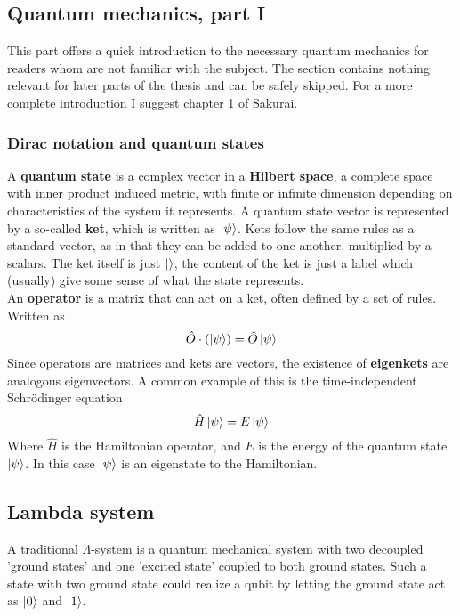 \subsection{Quantum mechanics, part I}
This part offers a quick introduction to the necessary  quantum mechanics for readers whom are not familiar with the subject. The section contains nothing relevant for later parts of the thesis and can be safely skipped. For a more complete introduction I suggest chapter 1 of Sakurai.

\subsubsection{Dirac notation and quantum states}
A \textbf{quantum state} is a complex vector in a \textbf{Hilbert space}, a complete space with inner product induced metric, with finite or infinite dimension depending on characteristics of the system it represents. A quantum state vector is represented by a so-called \textbf{ket}, which is written as $\ket{\psi}$. Kets follow the same rules as a standard vector, as in that they can be added to one another, multiplied by a scalars. The ket itself is just $\ket{}$, the content of the ket is just a label which (usually) give some sense of what the state represents. \\
An \textbf{operator} is a matrix that can act on a ket, often defined by a set of rules. Written as 
\begin{equation}
\hat{O}\cdot (\ket{\psi}) = \hat{O}\ket{\psi}
\end{equation}
Since operators are matrices and kets are vectors, the existence of \textbf{eigenkets} are analogous eigenvectors. A common example of this is the time-independent Schrödinger equation
\begin{equation}
\hat{H}\ket{\psi} = E \ket{\psi}
\end{equation}
Where $\hat{H}$ is the Hamiltonian operator, and $E$ is the energy of the quantum state $\ket{\psi}$. In this case $\ket{\psi}$ is an eigenstate to the Hamiltonian.





\subsection{Lambda system}
A traditional $\Lambda$-system is a quantum mechanical system with two decoupled 'ground states' and one 'excited state' coupled to both ground states. Such a state with two ground state could realize a qubit by letting the ground state act as $\ket{0}$ and $\ket{1}$.

